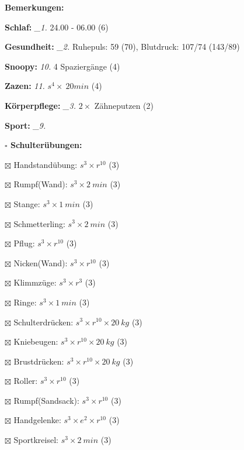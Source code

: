 \documentclass[10pt,a4paper]{article}
\newcommand\prop[1] {{\color {alizarin} {\bf #1}}}             %
\newcommand\mand[1] {{\color {burntorange} {\bf #1}}}          %
\newcommand\topspace{\vskip -15pt \hskip 20pt}
\newcommand\n[1] { {\sl #1.} \hskip 5pt }
\begin{document}
\begin{mdframed}[style=daystyle]
  \begin{labeling}{{\mand {Bemerkungen:}}}
    \setlength\itemsep{-3pt}
  \item[{\mand {Schlaf:}}]        \n{\_1} 24.00 - 06.00 (6)
  \item[{\mand {Gesundheit:}}]    \n{\_2} Ruhepuls: 59 (70), Blutdruck: 107/74 (143/89)
  \item[{\mand {Snoopy:}}]         \n{10} 4 Spaziergänge (4)
  \item[{\mand {Zazen:}}]          \n{11} $s^4 \times\ 20 min$ (4)
  \item[{\mand {Körperpflege:}}]  \n{\_3} $2 \times$ Zähneputzen (2)
  \item[{\mand {Sport:}}]         \n{\_9}
    \topspace
    \begin{minipage}{0.75\textwidth}  
      \begin{labeling}{\prop {$\square$ {Schulterübungen:}}} 
        \setlength\itemsep{-3pt}
      \item[$\boxtimes$ Handstandübung:]  $s^3 \times r^{10}$ (3)
      \item[$\boxtimes$ Rumpf(Wand):]     $s^3 \times 2\ min$ (3)
      \item[$\boxtimes$ Stange:]          $s^3 \times 1\ min$ (3)
      \item[$\boxtimes$ Schmetterling:]   $s^3 \times 2\ min$ (3)
      \item[$\boxtimes$ Pflug:]           $s^3 \times r^{10}$ (3)
      \item[$\boxtimes$ Nicken(Wand):]    $s^3 \times r^{10}$ (3)
      \item[$\boxtimes$ Klimmzüge:]       $s^3 \times r^3$ (3)
      \item[$\boxtimes$ Ringe:]           $s^3 \times 1\ min$ (3)
      \item[$\boxtimes$ Schulterdrücken:] $s^3 \times r^{10} \times 20\ kg$ (3)
      \item[$\boxtimes$ Kniebeugen:]      $s^3 \times r^{10} \times 20\ kg$ (3)
      \item[$\boxtimes$ Brustdrücken:]    $s^3 \times r^{10} \times 20\ kg$ (3)
      \item[$\boxtimes$ Roller:]          $s^3 \times r^{10}$ (3)
      \item[$\boxtimes$ Rumpf(Sandsack):] $s^3 \times r^{10}$ (3)
      \item[$\boxtimes$ Handgelenke:]     $s^3 \times e^2 \times r^{10}$ (3)
      \item[$\boxtimes$ Sportkreisel:]    $s^3 \times 2\ min$ (3)

\end{labeling}
\end{minipage}
\end{labeling}
\end{mdframed}
\end{document}
